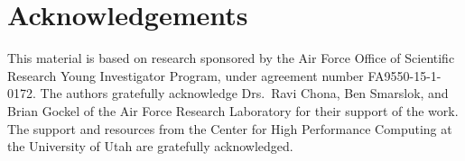 \section{Acknowledgements}
This material is based on research sponsored by the Air Force Office of Scientific Research Young Investigator Program, under agreement number FA9550-15-1-0172. The authors gratefully acknowledge Drs.~Ravi Chona, Ben Smarslok, and Brian Gockel of the Air Force Research Laboratory for their support of the work. The support and resources from the Center for High Performance Computing at the University of Utah are gratefully acknowledged.



